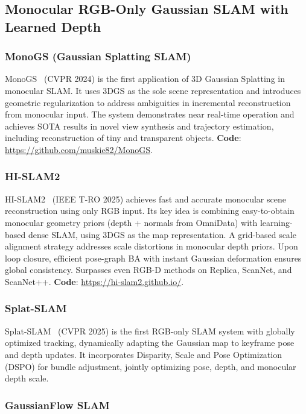 \subsection{Monocular RGB-Only Gaussian SLAM with Learned Depth}

\subsubsection{MonoGS (Gaussian Splatting SLAM)}

MonoGS~\cite{matsuki2024monogs} (CVPR 2024) is the first application of 3D
Gaussian Splatting in monocular SLAM.  It uses 3DGS as the sole scene
representation and introduces geometric regularization to address
ambiguities in incremental reconstruction from monocular input.  The system
demonstrates near real-time operation and achieves SOTA results in novel
view synthesis and trajectory estimation, including reconstruction of tiny
and transparent objects.  \textbf{Code}:
\url{https://github.com/muskie82/MonoGS}.

\subsubsection{HI-SLAM2}

HI-SLAM2~\cite{zhang2026_hislam2} (IEEE T-RO 2025) achieves fast and
accurate monocular scene reconstruction using only RGB input.  Its key idea
is combining easy-to-obtain monocular geometry priors (depth + normals from
OmniData) with learning-based dense SLAM, using 3DGS as the map
representation.  A grid-based scale alignment strategy addresses scale
distortions in monocular depth priors.  Upon loop closure, efficient
pose-graph BA with instant Gaussian deformation ensures global consistency.
Surpasses even RGB-D methods on Replica, ScanNet, and ScanNet++.  \textbf{Code}:
\url{https://hi-slam2.github.io/}.

\subsubsection{Splat-SLAM}

Splat-SLAM~\cite{sandstrom2025_splatslam} (CVPR 2025) is the first RGB-only
SLAM system with globally optimized tracking, dynamically adapting the
Gaussian map to keyframe pose and depth updates.  It incorporates
Disparity, Scale and Pose Optimization (DSPO) for bundle adjustment,
jointly optimizing pose, depth, and monocular depth scale.

\subsubsection{GaussianFlow SLAM}

